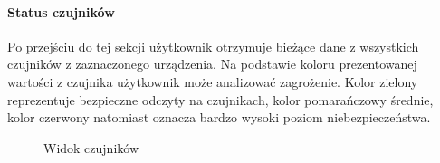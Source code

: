 \paragraph{Status czujników}
Po przejściu do tej sekcji użytkownik otrzymuje bieżące dane z wszystkich czujników z zaznaczonego urządzenia. Na podstawie koloru prezentowanej wartości z czujnika użytkownik może analizować zagrożenie. Kolor zielony reprezentuje bezpieczne odczyty na czujnikach, kolor pomarańczowy średnie, kolor czerwony natomiast oznacza bardzo wysoki poziom niebezpieczeństwa.
\nopagebreak
\begin{figure}[H]
    \centering
    \hfill
    \hfill
    \caption{Widok czujników}
    \label{fig:czujniki}
\end{figure}

